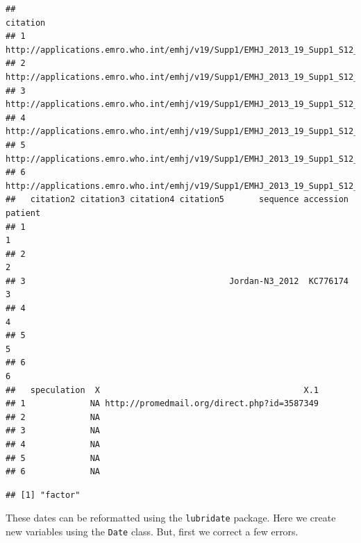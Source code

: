 \documentclass[]{article}
\newenvironment{Shaded}{\begin{snugshade}}{\end{snugshade}}
\newcommand{\KeywordTok}[1]{\textcolor[rgb]{0.13,0.29,0.53}{\textbf{#1}}}
\newcommand{\DecValTok}[1]{\textcolor[rgb]{0.00,0.00,0.81}{#1}}
\newcommand{\StringTok}[1]{\textcolor[rgb]{0.31,0.60,0.02}{#1}}
\newcommand{\OperatorTok}[1]{\textcolor[rgb]{0.81,0.36,0.00}{\textbf{#1}}}
\newcommand{\NormalTok}[1]{#1}
\begin{document}
\begin{verbatim}
##                                                                         citation
## 1 http://applications.emro.who.int/emhj/v19/Supp1/EMHJ_2013_19_Supp1_S12_S18.pdf
## 2 http://applications.emro.who.int/emhj/v19/Supp1/EMHJ_2013_19_Supp1_S12_S18.pdf
## 3 http://applications.emro.who.int/emhj/v19/Supp1/EMHJ_2013_19_Supp1_S12_S18.pdf
## 4 http://applications.emro.who.int/emhj/v19/Supp1/EMHJ_2013_19_Supp1_S12_S18.pdf
## 5 http://applications.emro.who.int/emhj/v19/Supp1/EMHJ_2013_19_Supp1_S12_S18.pdf
## 6 http://applications.emro.who.int/emhj/v19/Supp1/EMHJ_2013_19_Supp1_S12_S18.pdf
##   citation2 citation3 citation4 citation5       sequence accession patient
## 1                                                                        1
## 2                                                                        2
## 3                                         Jordan-N3_2012  KC776174       3
## 4                                                                        4
## 5                                                                        5
## 6                                                                        6
##   speculation  X                                         X.1
## 1             NA http://promedmail.org/direct.php?id=3587349
## 2             NA                                            
## 3             NA                                            
## 4             NA                                            
## 5             NA                                            
## 6             NA
\end{verbatim}

\begin{Shaded}
\end{Shaded}

\begin{verbatim}
## [1] "factor"
\end{verbatim}

These dates can be reformatted using the \texttt{lubridate} package.
Here we create new variables using the \texttt{Date} class. But, first
we correct a few errors.

\begin{Shaded}
\end{Shaded}
\end{document}
